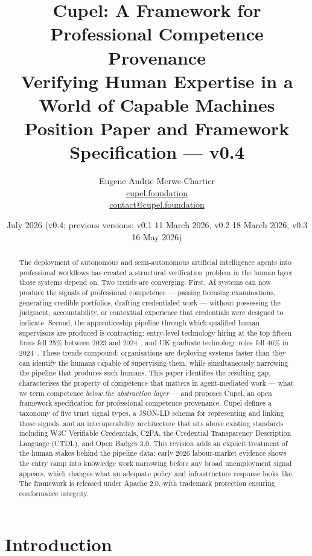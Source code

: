 \documentclass[11pt,a4paper]{article}
\title{\textbf{Cupel: A Framework for Professional Competence Provenance}\\
\large Verifying Human Expertise in a World of Capable Machines\\
\normalsize Position Paper and Framework Specification — v0.4}
\author{
  Eugene Andrie Merwe-Chartier\\
  \href{https://cupel.foundation}{cupel.foundation}\\
  \href{mailto:contact@cupel.foundation}{contact@cupel.foundation}
}
\date{July 2026 (v0.4; previous versions: v0.1 11 March 2026, v0.2 18 March 2026, v0.3 16 May 2026)}
\begin{document}
\maketitle

\begin{abstract}
The deployment of autonomous and semi-autonomous artificial intelligence agents into professional
workflows has created a structural verification problem in the human layer those systems depend on.
Two trends are converging. First, AI systems can now produce the signals of professional competence
— passing licensing examinations, generating credible portfolios, drafting credentialed work — without
possessing the judgment, accountability, or contextual experience that credentials were designed to
indicate. Second, the apprenticeship pipeline through which qualified human supervisors are produced
is contracting: entry-level technology hiring at the top fifteen firms fell 25\% between 2023 and
2024~\cite{signalfire2024}, and UK graduate technology roles fell 46\% in 2024~\cite{rezi2026}. These
trends compound: organisations are deploying systems faster than they can identify the humans
capable of supervising them, while simultaneously narrowing the pipeline that produces such humans.
This paper identifies the resulting gap, characterises the property of competence that matters in
agent-mediated work — what we term competence \emph{below the abstraction layer} — and proposes
Cupel, an open framework specification for professional competence provenance. Cupel defines a
taxonomy of five trust signal types, a JSON-LD schema for representing and linking those signals,
and an interoperability architecture that sits above existing standards including W3C Verifiable
Credentials, C2PA, the Credential Transparency Description Language (CTDL), and Open Badges 3.0.
This revision adds an explicit treatment of the human stakes behind the pipeline data: early 2026
labour-market evidence shows the entry ramp into knowledge work narrowing before any broad
unemployment signal appears, which changes what an adequate policy and infrastructure response
looks like. The framework is released under Apache 2.0, with trademark protection ensuring
conformance integrity.
\end{abstract}

\tableofcontents
\newpage

\section{Introduction}
\end{document}

